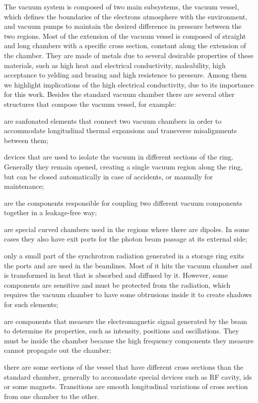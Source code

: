     The vacuum system is composed of two main subsystems, the vacuum vessel, which defines the boundaries of the electrons atmosphere with the environment, and vacuum pumps to maintain the desired difference in pressure between the two regions. Most of the extension of the vacuum vessel is composed of straight and long chambers with a specific cross section, constant along the extension of the chamber. They are made of metals due to several desirable properties of these materials, such as high heat and electrical conductivity, maleability, high acceptance to yelding and brasing and high resistence to pressure. Among them we highlight implications of the high electrical conductivity, due to its importance for this work. Besides the standard vacuum chamber there are several other structures that compose the vacuum vessel, for example:
    \begin{description}[align=left]
        \item[Bellows:] are sanfonated elements that connect two vacuum chambers in order to accommodate longitudinal thermal expansions and transverse misalignments between them;
        \item[Valves:] devices that are used to isolate the vacuum in different sections of the ring. Generally they remain opened, creating a single vacuum region along the ring, but can be closed automatically in case of accidents, or manually for maintenance;
        \item[Flanges:] are the components responsible for coupling two different vacuum components together in a leakage-free way;
        \item[Dipole Chambers:] are special curved chambers used in the regions where there are dipoles. In some cases they also have exit ports for the photon beam passage at its external side;
        \item[Radiation Masks:] only a small part of the synchrotron radiation generated in a storage ring exits the ports and are used in the beamlines. Most of it hits the vacuum chamber and is transformed in heat that is absorbed and diffused by it. However, some components are sensitive and must be protected from the radiation, which requires the vacuum chamber to have some obtrusions inside it to create shadows for such elements;
        \item[Diagnostic:] are components that measure the electromagnetic signal generated by the beam to determine its properties, such as intensity, positions and oscillations. They must be inside the chamber because the high frequency components they measure cannot propagate out the chamber;
        \item[Transitions:] there are some sections of the vessel that have different cross sections than the standard chamber, generally to accomodate special devices such as RF cavity, \gls{ids} or some magnets. Transitions are smooth longitudinal variations of cross section from one chamber to the other.
    \end{description}

